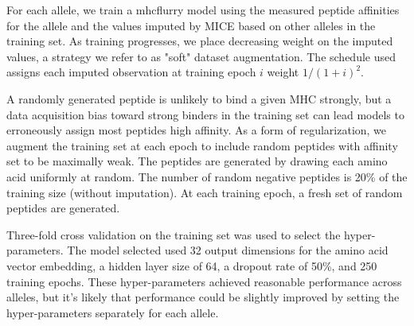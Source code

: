 For each allele, we train a mhcflurry model using the measured peptide affinities for the allele and the values imputed by MICE based on other alleles in the training set. As training progresses, we place decreasing weight on the imputed values, a strategy we refer to as "soft" dataset augmentation. The schedule used assigns each imputed observation at training epoch $i$ weight $1 / (1 + i)^2$.

A randomly generated peptide is unlikely to bind a given MHC strongly, but a data acquisition bias toward strong binders in the training set can lead models to erroneously assign most peptides high affinity. As a form of regularization, we augment the training set at each epoch to include random peptides with affinity set to be maximally weak. The peptides are generated by drawing each amino acid uniformly at random. The number of random negative peptides is 20\% of the training size (without imputation). At each training epoch, a fresh set of random peptides are generated.

Three-fold cross validation on the training set was used to select the hyper-parameters. The model selected used 32 output dimensions for the amino acid vector embedding, a hidden layer size of 64, a dropout rate\cite{Srivastava2014} of 50\%, and 250 training epochs. These hyper-parameters achieved reasonable performance across alleles, but it's likely that performance could be slightly improved by setting the hyper-parameters separately for each allele.